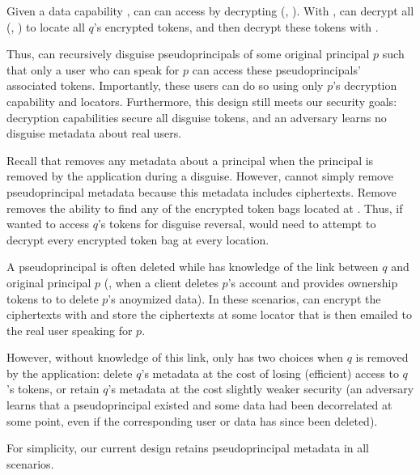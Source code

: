 Given a data capability , \sys can can access  by decrypting \enc(,
).
%
With , \sys can decrypt all \enc(, ) to locate all $q$'s encrypted
tokens, and then decrypt these tokens with . 

Thus, \sys can recursively disguise pseudoprincipals of some original principal $p$ such that only a
user who can speak for $p$ can access these pseudoprincipals' associated tokens.
Importantly, these users can do so using only $p$'s decryption capability and locators.
Furthermore, this design still meets our security goals: decryption capabilities secure all disguise
tokens, and an adversary learns no disguise metadata about real users.


Recall that \sys removes any metadata about a principal when the principal is removed by the
application during a disguise.
However, \sys cannot simply remove pseudoprincipal metadata because this metadata includes 
ciphertexts. Remove  removes the ability to find any of the encrypted token bags
located at . Thus, if \sys wanted to access $q$'s tokens for \eg disguise reversal, \sys
would need to attempt to decrypt every encrypted token bag at every location.

A pseudoprincipal is often deleted while \sys has knowledge of the link between $q$ and
original principal $p$ (\eg, when a client deletes $p$'s account and provides ownership tokens
to \sys to delete $p$'s anoymized data). In these scenarios, \sys can encrypt the
 ciphertexts with  and store the ciphertexts at some locator that is then emailed
to the real user speaking for $p$.

However, without knowledge of this link, \sys only has two choices when $q$ is removed by the
application: delete $q$'s metadata at the cost of losing (efficient) access to $q$'s tokens, or
retain $q$'s metadata at the cost slightly weaker security (an adversary learns that a
pseudoprincipal existed and some data had been decorrelated at some point, even if the corresponding
user or data has since been deleted).

For simplicity, our current design retains pseudoprincipal metadata in all scenarios.

\iffalse
Two strawmen, simple designs either fail to achieve this security property, or reduce functionality:
\begin{enumerate}
    \item \emph{Weak Security:} \sys can store \privk{q} in plaintext for pseudoprincipal $q$. 
        This is equivalent to $q$'s data being undisguised after compromise.  
    \item \emph{Permanent Disguises:} \sys throws away \privk{q} for pseudoprincipal $q$. This means that the
            disguise modifications to pseudoprincipal data are permanent, and prevents temporary
            recorrelation and disguise revealing.
\end{enumerate}

\fi
